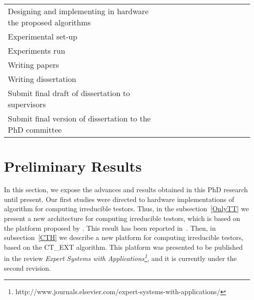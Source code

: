 \documentclass[authoryear,11pt]{elsarticle}
\begin{document}
\begin{table}[h!]
\begin{tabular}{|p{8cm}|c|c|c|c|c|c|c|c|c|c|c|c|}
		&&&&&&&\cellcolor[gray]{0.9}&\cellcolor[gray]{0.9}&\cellcolor[gray]{0.9}&&&\\
		\hline
		Designing and implementing in hardware the proposed algorithms
		&&&&&&&&\cellcolor[gray]{0.9}&\cellcolor[gray]{0.9}&&&\\
		\hline
		Experimental set-up &\cellcolor{blue}&\cellcolor{blue}&&\cellcolor[gray]{0.9}&
		\cellcolor[gray]{0.9}&&\cellcolor[gray]{0.9}&\cellcolor[gray]{0.9}&&&&\\
		\hline
		Experiments run &&&\cellcolor{blue}&\cellcolor[gray]{0.9}&&\cellcolor[gray]{0.9}&\cellcolor[gray]{0.9}&&
		\cellcolor[gray]{0.9}&&&\\
		\hline
		Writing papers &\cellcolor{blue}&&\cellcolor{blue}&&\cellcolor[gray]{0.9}&&\cellcolor[gray]{0.9}&&
		\cellcolor[gray]{0.9}&&&\\
		\hline
		Writing dissertation &&&&\cellcolor[gray]{0.9}&\cellcolor[gray]{0.9}&\cellcolor[gray]{0.9}&
		\cellcolor[gray]{0.9}&\cellcolor[gray]{0.9}&\cellcolor[gray]{0.9}&&&\\
		\hline
		Submit final draft of dissertation to supervisors &&&&&&&&&&\cellcolor[gray]{0.9}&&\\
		\hline
		Submit final version of dissertation to the PhD committee &&&&&&&&&&&\cellcolor[gray]{0.9}&\\
		\hline
		
 	\end{tabular}             
 \end{table}
 
	  	

\section{Preliminary Results}
	In this section, we expose the advances and results obtained in this PhD research until present.
	Our first studies were directed to hardware implementations of algorithm for computing
	irreducible testors. Thus, in the subsection~\ref{OnlyTT} we present a new architecture 
	for computing irreducible testors, which is based on the platform proposed by \cite{Rojas12}. 
	This result has been reported in~\citep{Rodriguez14}. Then, in subsection~\ref{CTH} we
	describe a new platform for computing irreducible testors, based on the CT\_EXT algorithm.
	This platform was presented to be published in the review \emph{Expert Systems with 
	Applications\footnote{http://www.journals.elsevier.com/expert-systems-with-applications/}}, and
	it is currently under the second revision.
	 
\end{document}
